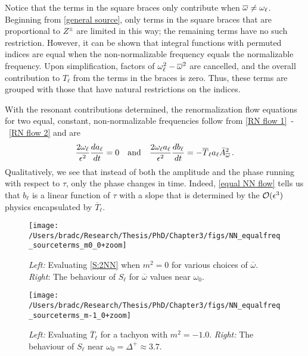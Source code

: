 \documentclass[../PhD.tex]{subfiles}
\newcommand{\ob}{\overline{\omega}}
\begin{document}
Notice that the terms in the square braces only contribute when $\ob \neq \ol$. Beginning from \eqref{general source}, only terms in the square braces that are proportional to $Z^{\pm}$ are limited in this way; the remaining terms have no such restriction. However, it can be shown that integral functions with permuted indices are equal when the non-normalizable frequency equals the normalizable frequency. Upon simplification, factors of $\ol^2 - \ob^2$ are cancelled, and the overall contribution to $T_{\ell}$ from the terms in the braces is zero. Thus, these terms are grouped with those that have natural restrictions on the indices. 

With the resonant contributions determined, the renormalization flow equations for two equal, constant, non-normalizable frequencies follow from \eqref{RN flow 1}~-~\eqref{RN flow 2} and are
\begin{align}
\label{equal NN flow}
\frac{2 \ol}{\epsilon^2} \frac{d a_\ell}{dt} =  0 \quad \text{and} \quad \frac{2 \ol a_\ell}{\epsilon^2} \frac{d b_\ell}{d t} = - \overline{T}_\ell a_\ell \bar A^2_{\ob} \, .
\end{align}
Qualitatively, we see that instead of both the amplitude and the phase running with respect to $\tau$, only the phase changes in time. Indeed, \eqref{equal NN flow} tells us that $b_\ell$ is a linear function of $\tau$ with a slope that is determined by the $\mathcal O(\epsilon^3)$ physics encapsulated by $\overline{T}_\ell$.

\begin{figure}
\centering
\texttt{[image: /Users/bradc/Research/Thesis/PhD/Chapter3/figs/NN\_equalfreq\_sourceterms\_m0\_0+zoom]}
\caption[Source term for two equal frequency, non-normalizable modes when $m^2 = 0$]{{\it Left:} Evaluating \eqref{S:2NN} when $m^2 = 0$ for various choices of $\ob$. {\it Right}: The behaviour of $S_\ell$ for $\ob$ values near $\omega_0$.}
\label{fig:equal_frequency_m0}
\end{figure}

\begin{figure}[h]
\centering
\texttt{[image: /Users/bradc/Research/Thesis/PhD/Chapter3/figs/NN\_equalfreq\_sourceterms\_m-1\_0+zoom]}
\caption[Source term for two equal frequency, non-normalizable modes when $m^2 = -1$]{{\it Left:} Evaluating $\overline{T}_{\ell}$ for a tachyon with $m^2 = -1.0$. {\it Right:} The behaviour of $S_\ell$ near $\omega_0 = \Delta^+ \approx  3.7$.}
\label{fig:equal_frequency_m-1_0}
\end{figure}
\end{document}

